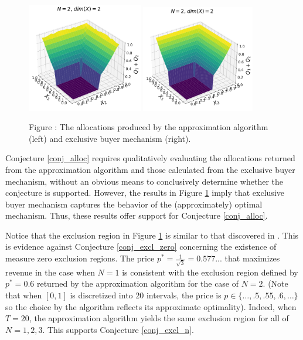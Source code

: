\begin{figure}[H]
    \begin{center}
    \includegraphics[width=0.45\textwidth]{images/symmetric_independent_unif_01.png}
    \includegraphics[width=0.44\textwidth]{images/symmetric_independent_unif_01_ebm.png}
    \end{center}
    
    \vspace{1mm}
    \raggedright{\small {\sc Figure \thefig\label{fig:pavlov_n2_alloc}:} The allocations produced by the approximation algorithm (left) and exclusive buyer mechanism (right).} 
\end{figure}

\noindent Conjecture \ref{conj_alloc} requires qualitatively evaluating the allocations returned from the approximation algorithm and those calculated from the exclusive buyer mechanism, without an obvious means to conclusively determine whether the conjecture is supported. However, the results in Figure \ref{fig:pavlov_n2_alloc} imply that exclusive buyer mechanism captures the behavior of the (approximately) optimal mechanism. Thus, these results offer support for Conjecture \ref{conj_alloc}.

Notice that the exclusion region in Figure \ref{fig:pavlov_n2_alloc} is similar to that discovered in \autocite{pavlov2011optimal}. This is evidence against Conjecture \ref{conj_excl_zero} concerning the existence of measure zero exclusion regions. The price $p^* = \frac{1}{\sqrt{3}} = 0.577...$ that maximizes revenue in the case when $N=1$ is consistent with the exclusion region defined by $p^* = 0.6$ returned by the approximation algorithm for the case of $N=2$. (Note that when $[0,1]$ is discretized into 20 intervals, the price is $p \in \{\dots, .5, .55, .6, \dots\}$ so the choice by the algorithm reflects its approximate optimality). Indeed, when $T=20$, the approximation algorithm yields the same exclusion region for all of $N=1,2,3$. This supports Conjecture \ref{conj_excl_n}.

